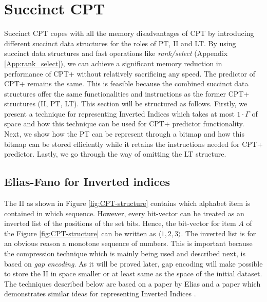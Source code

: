 \section{Succinct CPT}\label{ccpt}
Succinct CPT copes with all the memory disadvantages of CPT by introducing different succinct data structures for the roles of PT, II and LT. By using succinct data structures and fast operations like \emph{rank/select} (Appendix \ref{App:rank_select}), we can achieve a significant memory reduction in performance of CPT+ without relatively sacrificing any speed. The predictor of CPT+ remains the same. This is feasible because the combined succinct data structures offer the same functionalities and instructions as the former CPT+ structures (II, PT, LT). This section will be structured as follows. Firstly,  we present a technique for representing Inverted Indices which takes at most $1\cdot \Gamma$ of space and how this technique can be used for CPT+ predictor functionality. Next, we show how the PT can be represent through a bitmap and how this bitmap can be stored efficiently while it retains the instructions needed for CPT+ predictor. Lastly, we go through the way of omitting the LT structure.
\subsection{Elias-Fano for Inverted indices}\label{elicas_fano}
The II as shown in Figure \ref{fig:CPT-structure} contains which alphabet item is contained in which sequence. However, every bit-vector can be treated as an inverted list of the positions of the set bits. Hence, the bit-vector for item \(A\) of the Figure \ref{fig:CPT-structure} can be written as \(\langle 1, 2, 3\rangle\). The inverted list is for an obvious reason a monotone sequence of numbers. This is important because  the compression technique which is mainly being used and described next, is based on \emph{gap encoding}. As it will be proved later, gap encoding will make possible to store the II in space smaller or at least same as the space of the initial dataset. The techniques described below are based on a paper by Elias \cite{elias_efficient_1974} and a paper which demonstrates similar ideas for representing Inverted Indices \cite{vigna_quasi-succinct_2013}.
